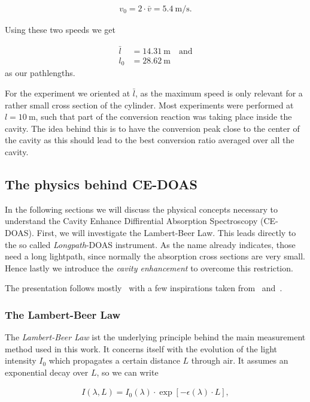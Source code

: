 \begin{align*}
  v_0 = 2\cdot \bar v = \SI{5.4}{\meter\per\second}.
\end{align*}

Using these two speeds we get

\begin{align*}
  \bar l & = \SI{14.31}{\meter} \quad \text{and}\\
  l_0 & = \SI{28.62}{\meter}
\end{align*}
as our pathlengths.

For the experiment we oriented at $\bar l$, as the maximum speed is
only relevant for a rather small cross section of the
cylinder. Most experiments were performed at $l = \SI{10}{\meter}$,
such that part of the conversion reaction was taking place inside the
cavity. The idea behind this is to have the conversion peak close to
the center of the cavity as this should lead to the best conversion
ratio averaged over all the cavity.

\subsection{The physics behind CE-DOAS}
\label{sec:ce-doas-physics}

In the following sections we will discuss the physical concepts
necessary to understand the Cavity Enhance Diffirential Absorption
Spectroscopy (CE-DOAS). First, we will investigate the Lambert-Beer
Law. This leads directly to the so called \emph{Longpath}-DOAS
instrument. As the name already indicates, those need a long
lightpath, since normally the absorption cross sections are very
small. Hence lastly we introduce the \emph{cavity enhancement} to
overcome this restriction.

The presentation follows mostly~\cite{fp58} with a few inspirations
taken from~\cite{bsc} and~\cite{platt}.

\subsubsection{The Lambert-Beer Law}
\label{sec:lambert-beer}

The \emph{Lambert-Beer Law} ist the underlying principle behind the
main measurement method used in this work. It concerns itself with the
evolution of the light intensity $I_0$ which propagates a certain
distance $L$ through air. It assumes an exponential decay over $L$, so
we can write

\begin{align}
  I(\lambda, L) = I_0(\lambda) \cdot \exp[-\epsilon(\lambda) \cdot
  L], \label{eq:lb-easy}
\end{align}

